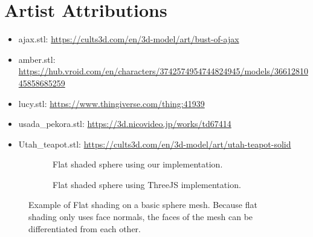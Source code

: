 \documentclass[10pt,twocolumn,letterpaper]{article}
\begin{document}
\section{Artist Attributions}
\begin{itemize}
    \item ajax.stl: \url{https://cults3d.com/en/3d-model/art/bust-of-ajax}
    \item amber.stl: \url{https://hub.vroid.com/en/characters/3742574954744824945/models/3661281045858685259}
    \item lucy.stl: \url{https://www.thingiverse.com/thing:41939}
    \item usada\_pekora.stl: \url{https://3d.nicovideo.jp/works/td67414}
    \item Utah\_teapot.stl: \url{https://cults3d.com/en/3d-model/art/utah-teapot-solid}
\end{itemize}



\begin{figure}
    \centering
    \begin{subfigure}{.48\linewidth}
        \caption{Flat shaded sphere using our implementation.}
        \label{fig:our-flat-sphere}
    \end{subfigure}
    \hfill
    \begin{subfigure}{.48\linewidth}
        \caption{Flat shaded sphere using ThreeJS implementation.}
        \label{fig:three-flat-sphere}
    \end{subfigure}
    \caption{Example of Flat shading on a basic sphere mesh. Because flat shading only uses face normals, the faces of the mesh can be differentiated from each other.}
    \label{fig:flat-sphere}
\end{figure}
\end{document}
